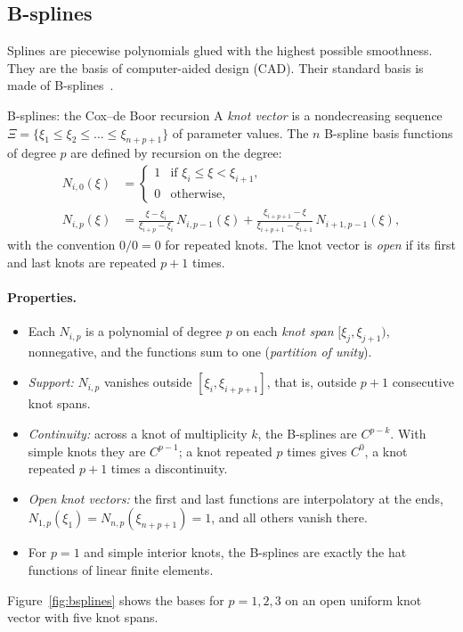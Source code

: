 \subsection{B-splines}\label{sec:var-bsplines}
%
Splines are piecewise polynomials glued with the highest possible smoothness.
They are the basis of computer-aided design (CAD). Their standard basis is
made of B-splines~\cite{deBoor1978,PieglTiller1997}.

\begin{gbox}{B-splines: the Cox--de Boor recursion}
A \emph{knot vector} is a nondecreasing sequence
$\Xi=\{\xi_1\le\xi_2\le\dots\le\xi_{n+p+1}\}$ of parameter values. The $n$
B-spline basis functions of degree $p$ are defined by recursion on the degree:
\begin{align*}
  N_{i,0}(\xi)&=\begin{cases}1&\text{if }\xi_i\le\xi<\xi_{i+1},\\
  0&\text{otherwise,}\end{cases}\\
  N_{i,p}(\xi)&=\frac{\xi-\xi_i}{\xi_{i+p}-\xi_i}\,N_{i,p-1}(\xi)
  +\frac{\xi_{i+p+1}-\xi}{\xi_{i+p+1}-\xi_{i+1}}\,N_{i+1,p-1}(\xi),
\end{align*}
with the convention $0/0=0$ for repeated knots. The knot vector is
\emph{open} if its first and last knots are repeated $p+1$ times.
\end{gbox}

\paragraph{Properties.}
%
\begin{itemize}
\item Each $N_{i,p}$ is a polynomial of degree $p$ on each \emph{knot span}
$[\xi_j,\xi_{j+1})$, nonnegative, and the functions sum to one
(\emph{partition of unity}).
\item \emph{Support:} $N_{i,p}$ vanishes outside $[\xi_i,\xi_{i+p+1}]$, that
is, outside $p+1$ consecutive knot spans.
\item \emph{Continuity:} across a knot of multiplicity $k$, the B-splines are
$C^{p-k}$. With simple knots they are $C^{p-1}$; a knot repeated $p$ times
gives $C^0$, a knot repeated $p+1$ times a discontinuity.
\item \emph{Open knot vectors:} the first and last functions are
interpolatory at the ends, $N_{1,p}(\xi_1)=N_{n,p}(\xi_{n+p+1})=1$, and all
others vanish there.
\item For $p=1$ and simple interior knots, the B-splines are exactly the hat
functions of linear finite elements.
\end{itemize}
Figure~\ref{fig:bsplines} shows the bases for $p=1,2,3$ on an open uniform
knot vector with five knot spans.

